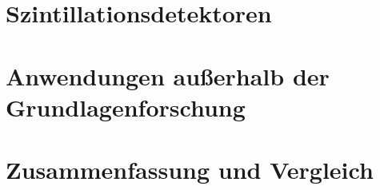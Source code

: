 \documentclass{beamer}
\begin{document}
\section{Szintillationsdetektoren}


% 

\section{Anwendungen außerhalb der Grundlagenforschung}



\section{Zusammenfassung und Vergleich}

\end{document}
